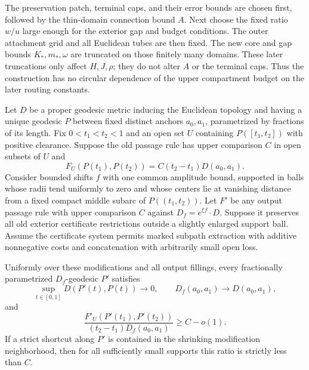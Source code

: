 \begin{remark}
\label{comp:construction-choice-order}
The preservation patch, terminal caps, and their error
bounds are chosen first, followed by the thin-domain
connection bound $A$.  Next choose the fixed ratio $w/u$
large enough for the exterior gap and budget conditions.
The outer attachment grid and all Euclidean tubes are then
fixed.  The new core and gap bounds $K_*,m_*,\omega$ are
truncated on those finitely many domains.  These later
truncations only affect $H,J,\rho$; they do not alter $A$
or the terminal caps.  Thus the construction has no
circular dependence of the upper compartment budget on
the later routing constants.
\end{remark}

\begin{lemma}
\label{comp:shrinking-modification-stability}
Let $D$ be a proper geodesic metric inducing the Euclidean
topology and having a unique geodesic $P$ between fixed distinct
anchors $a_0,a_1$, parametrized by fractions of its length.
Fix $0<t_1<t_2<1$ and an open set $U$ containing
$P([t_1,t_2])$ with positive clearance.  Suppose the old passage
rule has upper comparison $C$ in open subsets of $U$ and
\[
 F_U(P(t_1),P(t_2))
 =C(t_2-t_1)D(a_0,a_1).
\]
Consider bounded shifts $f$ with one common amplitude bound,
supported in balls whose radii tend uniformly to zero and whose
centers lie at vanishing distance from a fixed compact middle
subarc of $P((t_1,t_2))$.
Let $F'$ be any output passage rule with upper comparison $C$
against $D_f=e^{\xi f}\cdot D$.  Suppose it preserves all old
exterior certificate restrictions outside a slightly enlarged
support ball.  Assume the certificate system permits marked
subpath extraction with additive nonnegative costs and
concatenation with arbitrarily small open loss.

Uniformly over these modifications and all output fillings,
every fractionally parametrized $D_f$-geodesic $P'$ satisfies
\[
 \sup_{t\in[0,1]}D(P'(t),P(t))\longrightarrow0,
 \qquad
 D_f(a_0,a_1)\longrightarrow D(a_0,a_1),
\]
and
\[
 \frac{F'_U(P'(t_1),P'(t_2))}
 {(t_2-t_1)D_f(a_0,a_1)}\ge C-o(1).
\]
If a strict shortcut along $P'$ is contained in the shrinking
modification neighborhood, then for all sufficiently small
supports this ratio is strictly less than $C$.
\end{lemma}


